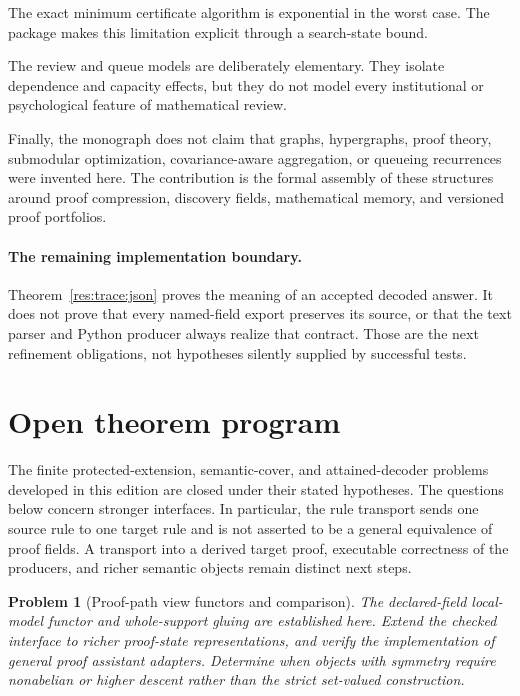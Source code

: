 \documentclass[11pt,oneside]{article}
\theoremstyle{komorebiplain}
\theoremstyle{komorebidefinition}
\newtheorem{problem}[theorem]{Problem}
\theoremstyle{komorebiremark}
\begin{document}
The exact minimum certificate algorithm is exponential in the worst case. The package makes this limitation explicit through a search-state bound.

The review and queue models are deliberately elementary. They isolate dependence and capacity effects, but they do not model every institutional or psychological feature of mathematical review.

Finally, the monograph does not claim that graphs, hypergraphs, proof theory, submodular optimization, covariance-aware aggregation, or queueing recurrences were invented here. The contribution is the formal assembly of these structures around proof compression, discovery fields, mathematical memory, and versioned proof portfolios.


\paragraph{The remaining implementation boundary.} Theorem~\ref{res:trace:json} proves the meaning of an accepted decoded answer. It does not prove that every named-field export preserves its source, or that the text parser and Python producer always realize that contract. Those are the next refinement obligations, not hypotheses silently supplied by successful tests.

\section{Open theorem program}
\label{sec:old28}

The finite protected-extension, semantic-cover, and attained-decoder problems developed in this edition are closed under their stated hypotheses. The questions below concern stronger interfaces. In particular, the rule transport sends one source rule to one target rule and is not asserted to be a general equivalence of proof fields. A transport into a derived target proof, executable correctness of the producers, and richer semantic objects remain distinct next steps.


\begin{problem}[Proof-path view functors and comparison]
\label{res:28:1}
The declared-field local-model functor and whole-support gluing are established here. Extend the checked interface to richer proof-state representations, and verify the implementation of general proof assistant adapters. Determine when objects with symmetry require nonabelian or higher descent rather than the strict set-valued construction.
\end{problem}
\end{document}

